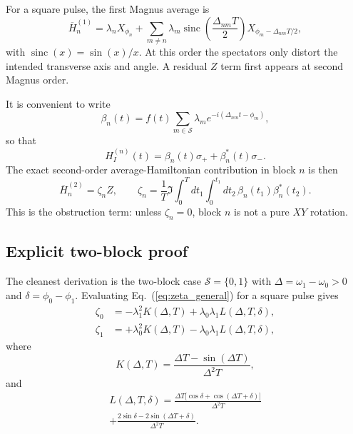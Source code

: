 \documentclass[aps,pra,twocolumn,reprint,floatfix,amsmath,amssymb]{revtex4-2}
\begin{document}
For a square pulse, the first Magnus average is
\begin{equation}
\overline{H}_{n}^{(1)}
= \lambda_n X_{\phi_n}
+ \sum_{m \neq n} \lambda_m
\operatorname{sinc}\!\left(\frac{\Delta_{nm}T}{2}\right)
X_{\phi_m-\Delta_{nm}T/2},
\label{eq:firstmagnus}
\end{equation}
with \(\operatorname{sinc}(x)=\sin(x)/x\). At this order the spectators only distort the intended transverse axis and angle. A residual \(Z\) term first appears at second Magnus order.

It is convenient to write
\begin{equation}
\beta_n(t)=f(t)\sum_{m \in \mathcal{S}} \lambda_m e^{-i(\Delta_{nm}t-\phi_m)},
\end{equation}
so that
\begin{equation}
H_I^{(n)}(t)=\beta_n(t)\sigma_+ + \beta_n^*(t)\sigma_- .
\end{equation}
The exact second-order average-Hamiltonian contribution in block \(n\) is then
\begin{equation}
\overline{H}_n^{(2)} = \zeta_n Z,
\qquad
\zeta_n =
\frac{1}{T}
\Im \int_0^T dt_1 \int_0^{t_1} dt_2\,
\beta_n(t_1)\beta_n^*(t_2).
\label{eq:zeta_general}
\end{equation}
This is the obstruction term: unless \(\zeta_n=0\), block \(n\) is not a pure \(XY\) rotation.

\subsection{Explicit two-block proof}

The cleanest derivation is the two-block case \(\mathcal{S}=\{0,1\}\) with \(\Delta = \omega_1-\omega_0 >0\) and \(\delta=\phi_0-\phi_1\). Evaluating Eq.~(\ref{eq:zeta_general}) for a square pulse gives
\begin{align}
\zeta_0 &= -\lambda_1^2 K(\Delta,T) + \lambda_0\lambda_1 L(\Delta,T,\delta), \\
\zeta_1 &= +\lambda_0^2 K(\Delta,T) - \lambda_0\lambda_1 L(\Delta,T,\delta),
\label{eq:twozeta}
\end{align}
where
\begin{equation}
K(\Delta,T)=\frac{\Delta T-\sin(\Delta T)}{\Delta^2 T},
\label{eq:Kdef}
\end{equation}
and
\begin{multline}
L(\Delta,T,\delta)=
\frac{
\Delta T\bigl[\cos\delta+\cos(\Delta T+\delta)\bigr]
}{\Delta^2 T}
\\
+ \frac{
2\sin\delta-2\sin(\Delta T+\delta)
}{\Delta^2 T}.
\label{eq:Ldef}
\end{multline}
\end{document}
